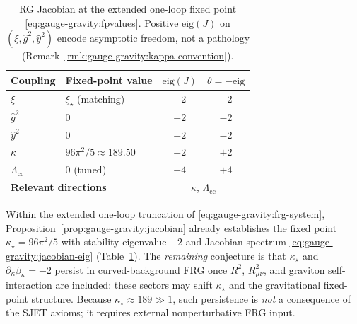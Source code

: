 \begin{table}[ht]
\centering
\small
\renewcommand{\arraystretch}{1.12}
\begin{tabular}{@{}llcc@{}}
\toprule
\textbf{Coupling} & \textbf{Fixed-point value} &
$\mathrm{eig}(J)$ & $\theta=-\mathrm{eig}$ \\
\midrule
$\xi$ & $\xi_\star$ (matching) & $+2$ & $-2$ \\
$\hat g^2$ & $0$ & $+2$ & $-2$ \\
$\hat y^2$ & $0$ & $+2$ & $-2$ \\
$\kappa$ & $96\pi^2/5\approx189.50$ & $-2$ & $+2$ \\
$\Lambda_{\mathrm{cc}}$ & $0$ (tuned) & $-4$ & $+4$ \\
\midrule
\multicolumn{2}{l}{\textbf{Relevant directions}} & \multicolumn{2}{c}{$\kappa$, $\Lambda_{\mathrm{cc}}$} \\
\bottomrule
\end{tabular}
\caption{RG Jacobian at the extended one-loop fixed point
\eqref{eq:gauge-gravity:fpvalues}. Positive $\mathrm{eig}(J)$ on
$(\xi,\hat g^2,\hat y^2)$ encode asymptotic freedom, not a pathology
(Remark~\ref{rmk:gauge-gravity:kappa-convention}).}
\label{tab:gauge-gravity:jacobian}
\end{table}

\begin{conjecture}
\label{conj:gauge-gravity:kappa}
Within the extended one-loop truncation of \eqref{eq:gauge-gravity:frg-system},
Proposition~\ref{prop:gauge-gravity:jacobian} already establishes the fixed point
$\kappa_\star=96\pi^2/5$ with stability eigenvalue $-2$ and Jacobian spectrum
\eqref{eq:gauge-gravity:jacobian-eig} (Table~\ref{tab:gauge-gravity:jacobian}).
The \emph{remaining} conjecture is that $\kappa_\star$ and
$\partial_\kappa\beta_\kappa=-2$ persist in curved-background FRG once $R^2$,
$R_{\mu\nu}^2$, and graviton self-interaction are included: these sectors may
shift $\kappa_\star$ and the gravitational fixed-point structure. Because
$\kappa_\star\approx189\gg1$, such persistence is \emph{not} a consequence of
the SJET axioms; it requires external nonperturbative FRG input.
\end{conjecture}

